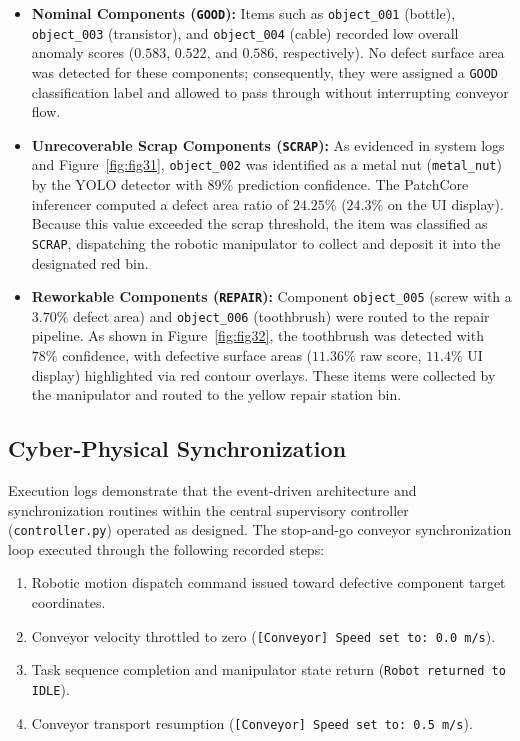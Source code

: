 \documentclass{article}
\begin{document}
\begin{itemize}
	\item \textbf{Nominal Components (\texttt{GOOD}):} Items such as \texttt{object\_001} (bottle), \texttt{object\_003} (transistor), and \texttt{object\_004} (cable) recorded low overall anomaly scores ($0.583$, $0.522$, and $0.586$, respectively). No defect surface area was detected for these components; consequently, they were assigned a \texttt{GOOD} classification label and allowed to pass through without interrupting conveyor flow.
	
	\item \textbf{Unrecoverable Scrap Components (\texttt{SCRAP}):} As evidenced in system logs and Figure~\ref{fig:fig31}, \texttt{object\_002} was identified as a metal nut (\texttt{metal\_nut}) by the YOLO detector with $89\%$ prediction confidence. The PatchCore inferencer computed a defect area ratio of \textbf{$24.25\%$} ($24.3\%$ on the UI display). Because this value exceeded the scrap threshold, the item was classified as \texttt{SCRAP}, dispatching the robotic manipulator to collect and deposit it into the designated red bin.
	
	\item \textbf{Reworkable Components (\texttt{REPAIR}):} Component \texttt{object\_005} (screw with a $3.70\%$ defect area) and \texttt{object\_006} (toothbrush) were routed to the repair pipeline. As shown in Figure~\ref{fig:fig32}, the toothbrush was detected with $78\%$ confidence, with defective surface areas ($11.36\%$ raw score, $11.4\%$ UI display) highlighted via red contour overlays. These items were collected by the manipulator and routed to the yellow repair station bin.
\end{itemize}

\subsection{Cyber-Physical Synchronization}
Execution logs demonstrate that the event-driven architecture and synchronization routines within the central supervisory controller (\texttt{controller.py}) operated as designed. The stop-and-go conveyor synchronization loop executed through the following recorded steps:

\begin{enumerate}
	\item Robotic motion dispatch command issued toward defective component target coordinates.
	\item Conveyor velocity throttled to zero (\texttt{[Conveyor] Speed set to: 0.0 m/s}).
	\item Task sequence completion and manipulator state return (\texttt{Robot returned to IDLE}).
	\item Conveyor transport resumption (\texttt{[Conveyor] Speed set to: 0.5 m/s}).
\end{enumerate}
\end{document}
